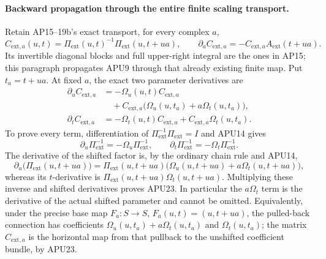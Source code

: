 \paragraph{Backward propagation through the entire finite scaling transport.}
Retain AP15--19b's exact transport, for every complex \(a\),
\[
 C_{\mathrm{ext},a}(u,t)
     =\Pi_{\mathrm{ext}}(u,t)^{-1}
           \Pi_{\mathrm{ext}}(u,t+ua),\qquad
 \partial_aC_{\mathrm{ext},a}
     =-C_{\mathrm{ext},a}A_{\mathrm{ext}}(t+ua).
\]
Its invertible diagonal blocks and full upper-right integral are
the ones in AP15; this paragraph propagates APU9 through that
already existing finite map.  Put \(t_a=t+ua\).  At fixed \(a\),
the exact two parameter derivatives are
\[
 \boxed{\begin{aligned}
 \partial_uC_{\mathrm{ext},a}
  &=-\Omega_u(u,t)C_{\mathrm{ext},a}\\
  &\quad+C_{\mathrm{ext},a}
        \bigl(\Omega_u(u,t_a)+a\Omega_t(u,t_a)\bigr),\\
 \partial_tC_{\mathrm{ext},a}
  &=-\Omega_t(u,t)C_{\mathrm{ext},a}
          +C_{\mathrm{ext},a}\Omega_t(u,t_a).
 \end{aligned}}
 \tag{APU23}
\]
To prove every term, differentiation of
\(\Pi_{\mathrm{ext}}^{-1}\Pi_{\mathrm{ext}}=I\) and APU14 gives
\[
 \partial_u\Pi_{\mathrm{ext}}^{-1}
       =-\Omega_u\Pi_{\mathrm{ext}}^{-1},\qquad
 \partial_t\Pi_{\mathrm{ext}}^{-1}
       =-\Omega_t\Pi_{\mathrm{ext}}^{-1}.
\]
The derivative of the shifted factor is, by the ordinary chain
rule and APU14,
\[
 \partial_u\bigl(\Pi_{\mathrm{ext}}(u,t+ua)\bigr)
  =\Pi_{\mathrm{ext}}(u,t+ua)
       \bigl(\Omega_u(u,t+ua)+a\Omega_t(u,t+ua)\bigr),
\]
whereas its \(t\)-derivative is
\(\Pi_{\mathrm{ext}}(u,t+ua)\Omega_t(u,t+ua)\).
Multiplying these inverse and shifted derivatives proves APU23.
In particular the \(a\Omega_t\) term is the derivative of the
actual shifted parameter and cannot be omitted.
Equivalently, under the precise base map
\(F_a:S\to S\), \(F_a(u,t)=(u,t+ua)\), the pulled-back connection
has coefficients \(\Omega_u(u,t_a)+a\Omega_t(u,t_a)\) and
\(\Omega_t(u,t_a)\); the matrix \(C_{\mathrm{ext},a}\) is the
horizontal map from that pullback to the unshifted coefficient
bundle, by APU23.

